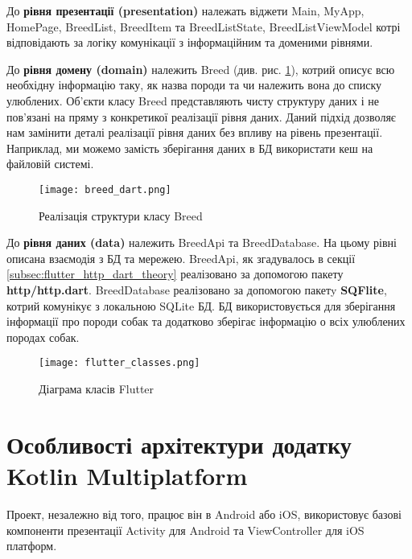 До \textbf{рівня презентації (presentation)} належать віджети Main, MyApp, HomePage, BreedList, BreedItem та
BreedListState, BreedListViewModel котрі відповідають за логіку комунікації з інформаційним та доменими рівнями.

До \textbf{рівня домену (domain)} належить Breed (див. рис. \ref{fig:flutter_breed_class}), котрий описує всю необхідну інформацію таку, як назва породи та чи
належить вона до списку улюблених. Об'єкти класу Breed представляють чисту структуру даних і не пов'язані на пряму
з конкретикої реалізації рівня даних. Даний підхід дозволяє нам замінити деталі реалізації рівня даних без впливу на
рівень презентації. Наприклад, ми можемо замість зберігання даних в БД використати кеш на файловій системі.

\begin{figure}
    \begin{center}
        \texttt{[image: breed\_dart.png]}
        \caption{Реалізація структури класу Breed}
        \label{fig:flutter_breed_class}
    \end{center}
\end{figure}


До \textbf{рівня даних (data)} належить BreedApi та BreedDatabase. На цьому рівні описана взаємодія з БД та мережею.
BreedApi, як згадувалось в секції \ref{subsec:flutter_http_dart_theory} реалізовано за допомогою пакету \textbf{http/http.dart}.
BreedDatabase реалізовано за допомогою пакетy \textbf{SQFlite}, котрий комунікує з локальною SQLite БД. БД використовується
для зберігання інформації про породи собак та додатково зберігає інформацію о всіх улюблених породах собак.

\begin{figure}
    \begin{center}
        \texttt{[image: flutter\_classes.png]}
        \caption{Діаграма класів Flutter}
        \label{fig:flutter_classes}
    \end{center}
\end{figure}


\section{Особливості архітектури додатку Kotlin Multiplatform}
\label{sec:kmm_architecture}

Проект, незалежно від того, працює він в Android або iOS, використовує базові компоненти презентації
Activity для Android та ViewController для iOS платформ.

